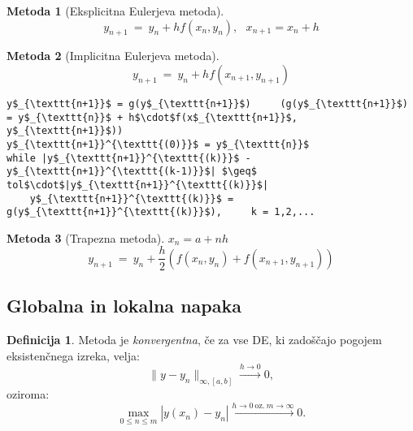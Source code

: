 \documentclass[11pt]{article}
\theoremstyle{definition}
\newtheorem{definicija}{Definicija}[section]
\theoremstyle{definition}
\newtheorem*{metoda}{Metoda}
\begin{document}
\begin{metoda}[Eksplicitna Eulerjeva metoda]

$$y_{n+1} ~=~ y_n + h f(x_n, y_n), ~~~x_{n+1} = x_n + h$$

\end{metoda}
\vspace{0.5cm}

\begin{metoda}[Implicitna Eulerjeva metoda]

$$y_{n+1} ~=~ y_n + h f(x_{n+1}, y_{n+1})$$

\begin{lstlisting}
y$_{\texttt{n+1}}$ = g(y$_{\texttt{n+1}}$)     (g(y$_{\texttt{n+1}}$) = y$_{\texttt{n}}$ + h$\cdot$f(x$_{\texttt{n+1}}$, y$_{\texttt{n+1}}$))
y$_{\texttt{n+1}}^{\texttt{(0)}}$ = y$_{\texttt{n}}$
while |y$_{\texttt{n+1}}^{\texttt{(k)}}$ - y$_{\texttt{n+1}}^{\texttt{(k-1)}}$| $\geq$ tol$\cdot$|y$_{\texttt{n+1}}^{\texttt{(k)}}$|
    y$_{\texttt{n+1}}^{\texttt{(k)}}$ = g(y$_{\texttt{n+1}}^{\texttt{(k)}}$),     k = 1,2,...
\end{lstlisting}

\end{metoda}
\vspace{0.5cm}

\begin{metoda}[Trapezna metoda]

$x_n = a + n h$
$$y_{n+1} ~=~ y_n + \frac{h}{2} (f(x_n, y_n) + f(x_{n+1}, y_{n+1}))$$

\end{metoda}
\vspace{0.5cm}


\subsection{Globalna in lokalna napaka}
\vspace{0.5cm}

\begin{definicija}

Metoda je \textit{konvergentna}, če za vse DE, ki zadoščajo pogojem eksistenčnega izreka, velja:
$$\|y - y_n\|_{\infty, [a, b]} \xrightarrow{h \rightarrow 0} 0,$$
oziroma:
$$\max_{0 \leq n \leq m} |y(x_n) - y_n| \xrightarrow{h \rightarrow 0 ~\text{oz.}~ m \rightarrow \infty} 0.$$

\end{definicija}
\vspace{0.5cm}
\end{document}
